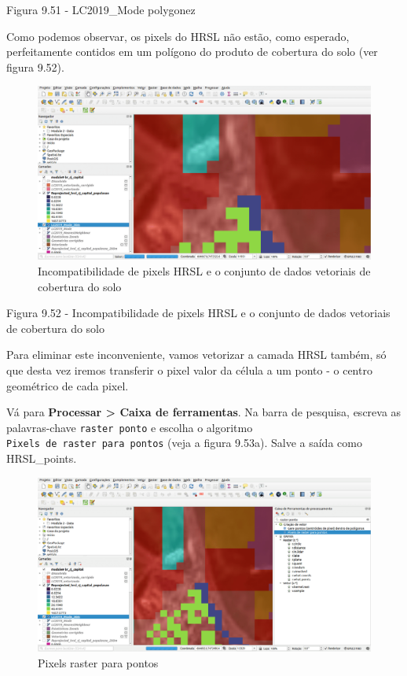 \documentclass[
]{krantz}
\begin{document}
Figura 9.51 - LC2019\_Mode polygonez

Como podemos observar, os pixels do HRSL não estão, como esperado, perfeitamente contidos em um polígono do produto de cobertura do solo (ver figura 9.52).

\begin{figure}
\centering
\includegraphics{media/modulo9/fig952.png}
\caption{Incompatibilidade de pixels HRSL e o conjunto de dados vetoriais de cobertura do solo}
\end{figure}

Figura 9.52 - Incompatibilidade de pixels HRSL e o conjunto de dados vetoriais de cobertura do solo

Para eliminar este inconveniente, vamos vetorizar a camada HRSL também, só que desta vez iremos transferir o pixel valor da célula a um ponto - o centro geométrico de cada pixel.

Vá para \textbf{Processar \textgreater{} Caixa de ferramentas}. Na barra de pesquisa, escreva as palavras-chave \texttt{raster\ ponto} e escolha o algoritmo \texttt{Pixels\ de\ raster\ para\ pontos} (veja a figura 9.53a). Salve a saída como HRSL\_points.

\begin{figure}
\centering
\includegraphics{media/modulo9/fig953_a.png}
\caption{Pixels raster para pontos}
\end{figure}
\end{document}
